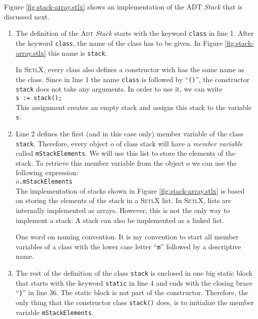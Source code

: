 Figure \ref{fig:stack-array.stlx} shows an implementation of the ADT \textsl{Stack} that is 
discussed next.
\begin{enumerate}
\item The definition of the \textsc{Adt} \textsl{Stack} starts with the keyword \texttt{class}
      in line 1.
      After the keyword \texttt{class}, the name of the class has to be given.  In Figure
      \ref{fig:stack-array.stlx} this name is \texttt{stack}.

      In \textsc{SetlX}, every class also defines a constructor wich has the same name as the class.
      Since in line 1 the name \texttt{class} is followed by ``\texttt{()}'', the constructor
      \texttt{stack} does not take any arguments.  In order to use it, we can write
      \\[0.2cm]
      \hspace*{1.3cm}
      \texttt{s := stack();}
      \\[0.2cm]
      This assignment creates an empty stack and assigns this stack to the variable \texttt{s}.
\item Line 2 defines the first (and in this case only) member variable of the class \texttt{stack}.
      Therefore, every object $o$ of class stack will have a \emph{member variable} called
      \texttt{mStackElements}. 
      We will use this list to store the elements of the stack.  To retrieve this member variable from
      the object $o$ we can use the following expression:
      \\[0.2cm]
      \hspace*{1.3cm}
      $o$\texttt{.mStackElements}
      \\[0.2cm]
      The implementation of stacks shown
      in Figure \ref{fig:stack-array.stlx} is based on storing the elements of the stack in a
      \textsc{SetlX} list.  In \textsc{SetlX}, lists are internally implemented as arrays.  However,
      this is not the only way to implement a stack: A stack can also be implemented as a linked list.

      One word on naming convention.  It is my convention to start all member variables of a class
      with the lower case letter ``\texttt{m}'' followed by a descriptive name.
\item The rest of the definition of the class \texttt{stack} is enclosed in one big static
      block that starts with the keyword \texttt{static} in line 4 and ends with the closing brace 
      ``\texttt{\}}'' in line 36.  The static block is not part of the constructor.
      Therefore, the only thing that the constructor class
      \texttt{stack()} does, is to initialize the member variable \texttt{mStackElements}.


\end{enumerate}
